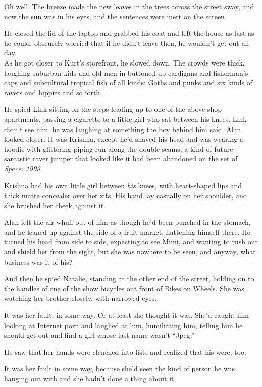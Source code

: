 Oh well.  The breeze made the new leaves in the trees across the
street sway, and now the sun was in his eyes, and the sentences were
inert on the screen.

He closed the lid of the laptop and grabbed his coat and left the
house as fast as he could, obscurely worried that if he didn't leave
then, he wouldn't get out all day.
\\
\lettrine[lines=3, lhang=.5, nindent=0pt, findent=2pt]{A}{s} he got closer to Kurt's storefront, he slowed down.  The crowds
were thick, laughing suburban kids and old men in buttoned-up
cardigans and fisherman's caps and subcultural tropical fish of all
kinds:  Goths and punks and six kinds of ravers and hippies and so
forth.

He spied Link sitting on the steps leading up to one of the above-shop
apartments, passing a cigarette to a little girl who sat between his
knees.  Link didn't see him, he was laughing at something the boy
behind him said.  Alan looked closer.  It was Krishna, except he'd
shaved his head and was wearing a hoodie with glittering piping run
along the double seams, a kind of future-sarcastic raver jumper that
looked like it had been abandoned on the set of \textit{Space:  1999}.

Krishna had his own little girl between \textit{his} knees, with
heart-shaped lips and thick matte concealer over her zits.  His hand
lay casually on her shoulder, and she brushed her cheek against it.

Alan felt the air whuff out of him as though he'd been punched in the
stomach, and he leaned up against the side of a fruit market,
flattening himself there.  He turned his head from side to side,
expecting to see Mimi, and wanting to rush out and shield her from the
sight, but she was nowhere to be seen, and anyway, what business was
it of his?

And then he spied Natalie, standing at the other end of the street,
holding on to the handles of one of the show bicycles out front of
Bikes on Wheels.  She was watching her brother closely, with narrowed
eyes.

It was her fault, in some way.  Or at least she thought it was.  She'd
caught him looking at Internet porn and laughed at him, humiliating
him, telling him he should get out and find a girl whose last name
wasn't ``Jpeg.''

He saw that her hands were clenched into fists and realized that his
were, too.

It was her fault in some way, because she'd seen the kind of person he
was hanging out with and she hadn't done a thing about it.

